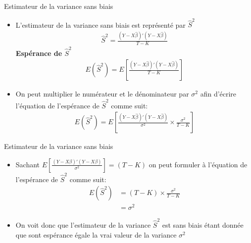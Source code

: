 \documentclass{beamer}
\begin{document}
\frame{\tableofcontents[current]}


\begin{frame}{Estimateur de la variance sans biais}
\begin{itemize}
\item L'estimateur de la variance sans biais est représenté par $\hat{S}^2$
\begin{align*}
\hat{S}^2=\frac{(Y-X \hat{\beta})'(Y-X \hat{\beta})}{T-K}
\end{align*}
\textbf{Espérance de $\hat{S}^2$}
\begin{align*}
E(\hat{S}^2)=E \left[ \frac{(Y-X \hat{\beta})'(Y-X \hat{\beta})}{T-K}\right]
\end{align*}
\item On peut multiplier le numérateur et le dénominateur par $\sigma^2$ afin d'écrire l'équation de l'espérance de $\hat{S}^2$ comme suit:
\begin{align*}
E(\hat{S}^2)=E \left[ \frac{(Y-X \hat{\beta})'(Y-X \hat{\beta})}{\sigma^2} \times \frac{\sigma^2}{T-K}\right]
\end{align*}
\end{itemize}
\end{frame}

\begin{frame}{Estimateur de la variance sans biais}
\begin{itemize}
\item Sachant $E \left[ \frac{(Y-X \beta)'(Y-X \beta)}{\sigma^2}\right]=(T-K)$ on peut formuler à l'équation de l'espérance de $\hat{S}^2$ comme suit:
\begin{align*}
E(\hat{S}^2) & =(T-K) \times \frac{\sigma^2}{T-K} \\ & = \sigma^2
\end{align*}
\item On voit donc que l'estimateur de la variance $\hat{S}^2$ est sans biais étant donnée que sont espérance égale la vrai valeur de la variance $\sigma^2$
\end{itemize}
\end{frame}
\end{document}
